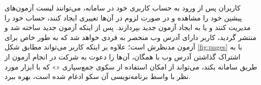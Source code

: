کاربران پس از ورود به حساب کاربری خود در سامانه، می‌توانند لیست آزمون‌های پیشین خود را مشاهده و در صورت لزوم در آن‌ها تغییری ایجاد کنند، حساب خود را مدیریت کنند و یا به ایجاد آزمون جدید بپردازند. پس از اینکه آزمون جدید ساخته شد و منتشر گردید، کاربر دارای آدرس وب منحصر به فردی خواهد شد که به طور خاص برای آزمون مدنظرش است؛ علاوه بر اینکه کاربر می‌تواند مطابق شکل
\ref{fig:pages}
 با به اشتراک گذاشتن آدرس وب با همگان، آن‌ها را دعوت به شرکت در انجام آزمون از طریق سامانه بکند، می‌تواند از امکان استفاده از سکوی جمع‌سپاری
«»
که با ابزار مورد نظر با واسط برنامه‌نویسی آن سکو ادغام شده است، بهره ببرد.\\


















